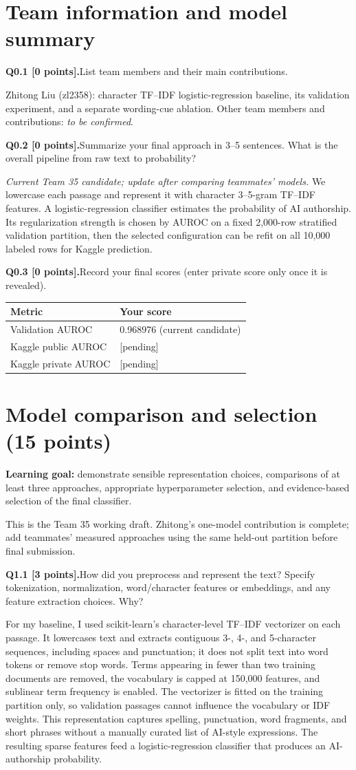 \documentclass[11pt,letterpaper]{article}
\newcommand{\question}[2]{\needspace{4\baselineskip}\par\addvspace{0.45em}\noindent\textbf{#1}\quad #2\par\nobreak\vspace{0.1em}}
\newcommand{\smallnote}[1]{{\small\color{muted}#1}}
\begin{document}
\section{Team information and model summary}
\question{Q0.1 [0 points].}{List team members and their main contributions.}
Zhitong Liu (zl2358): character TF--IDF logistic-regression baseline, its validation experiment, and a separate wording-cue ablation. Other team members and contributions: \textit{to be confirmed}.
\question{Q0.2 [0 points].}{Summarize your final approach in 3--5 sentences. What is the overall pipeline from raw text to probability?}
\textit{Current Team 35 candidate; update after comparing teammates' models.} We lowercase each passage and represent it with character 3--5-gram TF--IDF features. A logistic-regression classifier estimates the probability of AI authorship. Its regularization strength is chosen by AUROC on a fixed 2,000-row stratified validation partition, then the selected configuration can be refit on all 10,000 labeled rows for Kaggle prediction.
\question{Q0.3 [0 points].}{Record your final scores (enter private score only once it is revealed).}
\begin{tabularx}{\linewidth}{@{}Yp{1.8in}@{}}\toprule Metric & Your score \\ \midrule Validation AUROC & 0.968976 (current candidate) \\ Kaggle public AUROC & [pending] \\ Kaggle private AUROC & [pending] \\ \bottomrule\end{tabularx}

\newpage
\section{Model comparison and selection (15 points)}
\textbf{Learning goal:} demonstrate sensible representation choices, comparisons of at least three approaches, appropriate hyperparameter selection, and evidence-based selection of the final classifier.

\smallnote{This is the Team 35 working draft. Zhitong's one-model contribution is complete; add teammates' measured approaches using the same held-out partition before final submission.}

\question{Q1.1 [3 points].}{How did you preprocess and represent the text? Specify tokenization, normalization, word/character features or embeddings, and any feature extraction choices. Why?}
For my baseline, I used scikit-learn's character-level TF--IDF vectorizer on each passage. It lowercases text and extracts contiguous 3-, 4-, and 5-character sequences, including spaces and punctuation; it does not split text into word tokens or remove stop words. Terms appearing in fewer than two training documents are removed, the vocabulary is capped at 150,000 features, and sublinear term frequency is enabled. The vectorizer is fitted on the training partition only, so validation passages cannot influence the vocabulary or IDF weights. This representation captures spelling, punctuation, word fragments, and short phrases without a manually curated list of AI-style expressions. The resulting sparse features feed a logistic-regression classifier that produces an AI-authorship probability.
\end{document}
